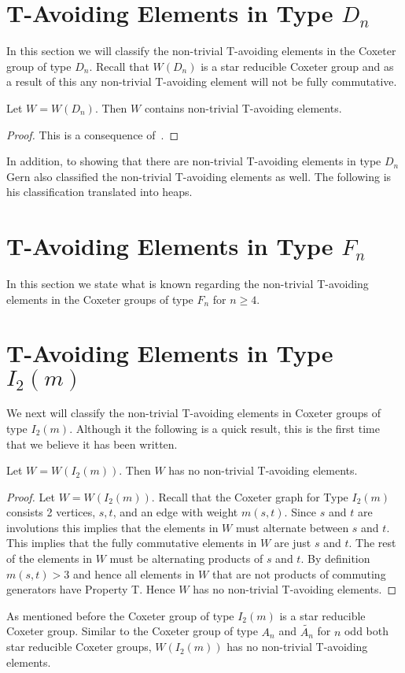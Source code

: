
\section{T-Avoiding Elements in Type $D_n$}

In this section we will classify the non-trivial T-avoiding elements in the Coxeter group of type $D_n$. Recall that $W(D_n)$ is a star reducible Coxeter group and as a result of this any non-trivial T-avoiding element will not be fully commutative.

\begin{theorem}
Let $W=W(D_n)$. Then $W$ contains non-trivial T-avoiding elements.
\begin{proof}
	This is a consequence of~\cite[Section 2.2]{Gern2013}.
\end{proof}
\end{theorem}

In addition, to showing that there are non-trivial T-avoiding elements in type $D_n$ Gern also classified the non-trivial T-avoiding elements as well. The following is his classification translated into heaps. 


\section{T-Avoiding Elements in Type $F_n$}

In this section we state what is known regarding the non-trivial T-avoiding elements in the Coxeter groups of type $F_n$ for $n \geq 4$. 



\section{T-Avoiding Elements in Type $I_2(m)$}

We next will classify the non-trivial T-avoiding elements in Coxeter groups of type $I_2(m)$. Although it the following is a quick result, this is the first time that we believe it has been written.
\begin{theorem}
Let $W=W(I_2(m))$. Then $W$ has no non-trivial T-avoiding elements.
\begin{proof}
	Let $W=W(I_2(m))$. Recall that the Coxeter graph for Type $I_2(m)$ consists 2 vertices, $s,t$, and an edge with weight $m(s,t)$. Since $s$ and $t$ are involutions this implies that the elements in $W$ must alternate between $s$ and $t$. This implies that the fully commutative elements in $W$ are just $s$ and $t$. The rest of the elements in $W$ must be alternating products of $s$ and $t$. By definition $m(s,t)>3$ and hence all elements in $W$ that are not products of commuting generators have Property T. Hence $W$ has no non-trivial T-avoiding elements. 
\end{proof}	
\end{theorem}
 
As mentioned before the Coxeter group of type $I_2(m)$ is a star reducible Coxeter group. Similar to the Coxeter group of type $A_n$ and $\widetilde{A_n}$ for $n$ odd both star reducible Coxeter groups, $W(I_2(m))$ has no non-trivial T-avoiding elements. 


